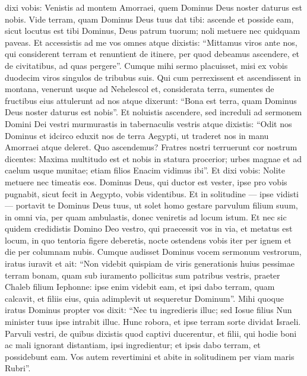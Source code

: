 \begin{biblechapter}
\verse dixi vobis: Venistis ad montem Amorraei, quem Dominus Deus noster daturus est nobis. 
\verse Vide terram, quam Dominus Deus tuus dat tibi: ascende et posside eam, sicut locutus est tibi Dominus, Deus patrum tuorum; noli metuere nec quidquam paveas. 
\verse Et accessistis ad me vos omnes atque dixistis: “Mittamus viros ante nos, qui considerent terram et renuntient de itinere, per quod debeamus ascendere, et de civitatibus, ad quas pergere”. 
\verse Cumque mihi sermo placuisset, misi ex vobis duodecim viros singulos de tribubus suis. 
\verse Qui cum perrexissent et ascendissent in montana, venerunt usque ad Nehelescol et, considerata terra,  
\verse sumentes de fructibus eius attulerunt ad nos atque dixerunt: “Bona est terra, quam Dominus Deus noster daturus est nobis”. 
\verse Et noluistis ascendere, sed increduli ad sermonem Domini Dei vestri 
\verse murmurastis in tabernaculis vestris atque dixistis: “Odit nos Dominus et idcirco eduxit nos de terra Aegypti, ut traderet nos in manu Amorraei atque deleret. 
\verse Quo ascendemus? Fratres nostri terruerunt cor nostrum dicentes: Maxima multitudo est et nobis in statura procerior; urbes magnae et ad caelum usque munitae; etiam filios Enacim vidimus ibi”. 
\verse Et dixi vobis: Nolite metuere nec timeatis eos. 
\verse Dominus Deus, qui ductor est vester, ipse pro vobis pugnabit, sicut fecit in Aegypto, vobis videntibus. 
\verse Et in solitudine — ipse vidisti — portavit te Dominus Deus tuus, ut solet homo gestare parvulum filium suum, in omni via, per quam ambulastis, donec veniretis ad locum istum. 
\verse Et nec sic quidem credidistis Domino Deo vestro, 
\verse qui praecessit vos in via, et metatus est locum, in quo tentoria figere deberetis, nocte ostendens vobis iter per ignem et die per columnam nubis. 
\verse Cumque audisset Dominus vocem sermonum vestrorum, iratus iuravit et ait:  
\verse “Non videbit quispiam de viris generationis huius pessimae terram bonam, quam sub iuramento pollicitus sum patribus vestris, 
\verse praeter Chaleb filium Iephonne: ipse enim videbit eam, et ipsi dabo terram, quam calcavit, et filiis eius, quia adimplevit ut sequeretur Dominum”. 
\verse Mihi quoque iratus Dominus propter vos dixit: “Nec tu ingredieris illuc; 
\verse sed Iosue filius Nun minister tuus ipse intrabit illuc. Hunc robora, et ipse terram sorte dividat Israeli. 
\verse Parvuli vestri, de quibus dixistis quod captivi ducerentur, et filii, qui hodie boni ac mali ignorant distantiam, ipsi ingredientur; et ipsis dabo terram, et possidebunt eam. 
\verse Vos autem revertimini et abite in solitudinem per viam maris Rubri”. 

\end{biblechapter}
